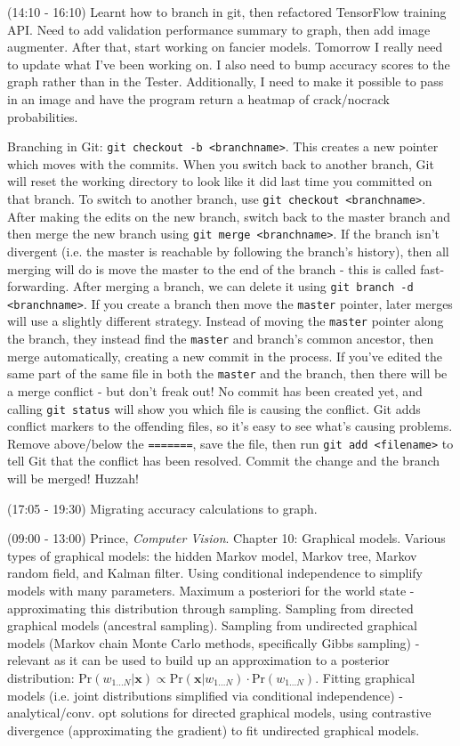 \documentclass[idxtotoc,hyperref,openany]{labbook} %
\begin{document}
(14:10 - 16:10) Learnt how to branch in git, then refactored TensorFlow training API. Need to add validation performance summary to graph, then add image augmenter. After that, start working on fancier models. Tomorrow I really need to update what I've been working on. I also need to bump accuracy scores to the graph rather than in the Tester. Additionally, I need to make it possible to pass in an image and have the program return a heatmap of crack/nocrack probabilities.

Branching in Git: \texttt{git checkout -b <branchname>}. This creates a new pointer which moves with the commits. When you switch back to another branch, Git will reset the working directory to look like it did last time you committed on that branch. To switch to another branch, use \texttt{git checkout <branchname>}. After making the edits on the new branch, switch back to the master branch and then merge the new branch using \texttt{git merge <branchname>}. If the branch isn't divergent (i.e. the master is reachable by following the branch's history), then all merging will do is move the master to the end of the branch - this is called fast-forwarding. After merging a branch, we can delete it using \texttt{git branch -d <branchname>}. If you create a branch then move the \texttt{master} pointer, later merges will use a slightly different strategy. Instead of moving the \texttt{master} pointer along the branch, they instead find the \texttt{master} and branch's common ancestor, then merge automatically, creating a new commit in the process. If you've edited the same part of the same file in both the \texttt{master} and the branch, then there will be a merge conflict - but don't freak out! No commit has been created yet, and calling \texttt{git status} will show you which file is causing the conflict. Git adds conflict markers to the offending files, so it's easy to see what's causing problems. Remove above/below the \texttt{=======}, save the file, then run \texttt{git add <filename>} to tell Git that the conflict has been resolved. Commit the change and the branch will be merged! Huzzah!

(17:05 - 19:30) Migrating accuracy calculations to graph.



(09:00 - 13:00) Prince, \emph{Computer Vision}. Chapter 10: Graphical models. Various types of graphical models: the hidden Markov model, Markov tree, Markov random field, and Kalman filter. Using conditional independence to simplify models with many parameters. Maximum a posteriori for the world state - approximating this distribution through sampling. Sampling from directed graphical models (ancestral sampling). Sampling from undirected graphical models (Markov chain Monte Carlo methods, specifically Gibbs sampling) - relevant as it can be used to build up an approximation to a posterior distribution: $\text{Pr}(w_{1...N}|\mathbf{x}) \propto \text{Pr}(\mathbf{x}|w_{1...N})\cdot\text{Pr}(w_{1...N})$. Fitting graphical models (i.e. joint distributions simplified via conditional independence) - analytical/conv. opt solutions for directed graphical models, using contrastive divergence (approximating the gradient) to fit undirected graphical models.
\end{document}
